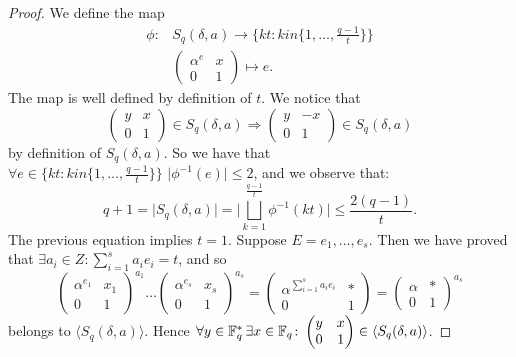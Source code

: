 \begin{theorem}
\begin{proof}
We define the map
\begin{align*}
	\phi \colon & S_q(\delta,a) \longrightarrow \{kt \colon k in \{1, \dots ,\frac{q-1}{t}\}\}\\
				&  \begin{pmatrix} \alpha^e & x \\ 0 & 1 \end{pmatrix} \longmapsto e.
\end{align*}
The map is well defined by definition of $t$.
We notice that
\begin{equation}\label{double}
\begin{pmatrix} y & x \\ 0 & 1 \end{pmatrix} \in S_q(\delta,a) \Rightarrow \begin{pmatrix} y & -x \\ 0 & 1 \end{pmatrix} \in S_q(\delta,a)
\end{equation}
by definition of $S_q(\delta,a)$. So we have that
$\forall e \in \{kt \colon k in \{1, \dots ,\frac{q-1}{t}\}\} \,\, \vert \phi^{-1}(e)\vert \le 2$, and we observe that:
\begin{equation*}
	q+1 = \vert S_q(\delta,a)\vert = \vert \bigsqcup_{k=1}^{\frac{q-1}{t}} \phi^{-1}(kt) \vert \le \frac{2(q-1)}{t}.
\end{equation*}
The previous equation implies $t=1$.
Suppose $E={e_1,\dots, e_s}$. Then we have proved that $\exists a_i \in Z \colon \sum_{i=1}^s a_i e_i =t$, and so
\begin{equation}
	\begin{pmatrix} \alpha^{e_1} & x_1 \\ 0 & 1 \end{pmatrix}^{a_1} \dots 
	\begin{pmatrix} \alpha^{e_s} & x_s \\ 0 & 1 \end{pmatrix}^{a_s}=
	\begin{pmatrix} \alpha^{\sum_{i=1}^s a_i e_i} & * \\ 0 & 1 \end{pmatrix}=
	\begin{pmatrix} \alpha & * \\ 0 & 1 \end{pmatrix}^{a_s}
\end{equation}
 belongs to $\langle S_q(\delta,a) \rangle$. Hence $\forall y \in {\mathbb F}_q^{*}\, \exists x \in {\mathbb F}_q \colon 
 \begin{pmatrix} y & x \\ 0 & 1 \end{pmatrix} \in \langle S_q(\delta,a) \rangle$. 


\end{proof}
\end{theorem}
